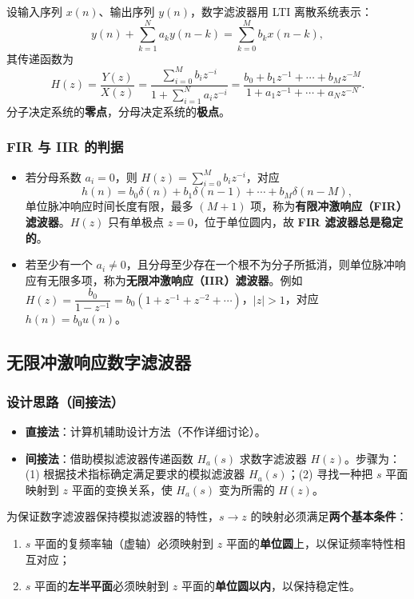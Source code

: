 设输入序列 $x(n)$、输出序列 $y(n)$，数字滤波器用 LTI 离散系统表示：
\begin{equation}
y(n)+\sum_{k=1}^{N}a_k y(n-k)=\sum_{k=0}^{M}b_k x(n-k),
\end{equation}
其传递函数为
\begin{equation}
H(z)=\frac{Y(z)}{X(z)}=\frac{\sum\limits_{i=0}^{M}b_i z^{-i}}{1+\sum\limits_{i=1}^{N}a_i z^{-i}}
=\frac{b_0+b_1z^{-1}+\cdots+b_Mz^{-M}}{1+a_1z^{-1}+\cdots+a_Nz^{-N}} .
\end{equation}
分子决定系统的\textbf{零点}，分母决定系统的\textbf{极点}。

\subsubsection{FIR 与 IIR 的判据}
\begin{itemize}
\item 若分母系数 $a_i=0$，则 $H(z)=\sum\limits_{i=0}^{M}b_iz^{-i}$，对应
\begin{equation}
h(n)=b_0\delta(n)+b_1\delta(n-1)+\cdots+b_M\delta(n-M),
\end{equation}
单位脉冲响应时间长度有限，最多 $(M+1)$ 项，称为\textbf{有限冲激响应（FIR）滤波器}。$H(z)$ 只有单极点 $z=0$，位于单位圆内，故 \textbf{FIR 滤波器总是稳定的}。
\item 若至少有一个 $a_i\ne0$，且分母至少存在一个根不为分子所抵消，则单位脉冲响应有无限多项，称为\textbf{无限冲激响应（IIR）滤波器}。例如 $H(z)=\dfrac{b_0}{1-z^{-1}}=b_0(1+z^{-1}+z^{-2}+\cdots)$，$|z|>1$，对应 $h(n)=b_0u(n)$。
\end{itemize}

\subsection{无限冲激响应数字滤波器}

\subsubsection{设计思路（间接法）}
\begin{itemize}
\item \textbf{直接法}：计算机辅助设计方法（不作详细讨论）。
\item \textbf{间接法}：借助模拟滤波器传递函数 $H_a(s)$ 求数字滤波器 $H(z)$。步骤为：(1) 根据技术指标确定满足要求的模拟滤波器 $H_a(s)$；(2) 寻找一种把 $s$ 平面映射到 $z$ 平面的变换关系，使 $H_a(s)$ 变为所需的 $H(z)$。
\end{itemize}
为保证数字滤波器保持模拟滤波器的特性，$s\to z$ 的映射必须满足\textbf{两个基本条件}：
\begin{enumerate}
\item $s$ 平面的复频率轴（虚轴）必须映射到 $z$ 平面的\textbf{单位圆}上，以保证频率特性相互对应；
\item $s$ 平面的\textbf{左半平面}必须映射到 $z$ 平面的\textbf{单位圆以内}，以保持稳定性。
\end{enumerate}

